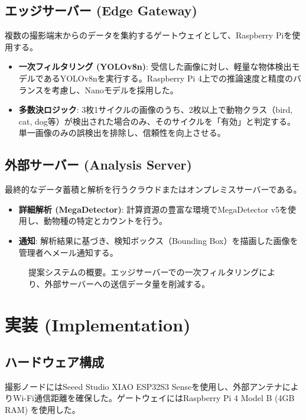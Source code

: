 \documentclass[twocolumn,a4paper]{article}
\begin{document}
\subsection{エッジサーバー (Edge Gateway)}
複数の撮影端末からのデータを集約するゲートウェイとして、Raspberry Piを使用する。
\begin{itemize}
    \item \textbf{一次フィルタリング (YOLOv8n)}: 受信した画像に対し、軽量な物体検出モデルであるYOLOv8nを実行する。Raspberry Pi 4上での推論速度と精度のバランスを考慮し、Nanoモデルを採用した。
    \item \textbf{多数決ロジック}: 3枚1サイクルの画像のうち、2枚以上で動物クラス（bird, cat, dog等）が検出された場合のみ、そのサイクルを「有効」と判定する。単一画像のみの誤検出を排除し、信頼性を向上させる。
\end{itemize}

\subsection{外部サーバー (Analysis Server)}
最終的なデータ蓄積と解析を行うクラウドまたはオンプレミスサーバーである。
\begin{itemize}
    \item \textbf{詳細解析 (MegaDetector)}: 計算資源の豊富な環境でMegaDetector v5を使用し、動物種の特定とカウントを行う。
    \item \textbf{通知}: 解析結果に基づき、検知ボックス（Bounding Box）を描画した画像を管理者へメール通知する。
\end{itemize}

\begin{figure}[t]
  \centering
  \caption{提案システムの概要。エッジサーバーでの一次フィルタリングにより、外部サーバーへの送信データ量を削減する。}
  \label{fig:system_overview}
\end{figure}

\section{実装 (Implementation)}
\subsection{ハードウェア構成}
撮影ノードにはSeeed Studio XIAO ESP32S3 Senseを使用し、外部アンテナによりWi-Fi通信距離を確保した。ゲートウェイにはRaspberry Pi 4 Model B (4GB RAM) を使用した。
\end{document}
